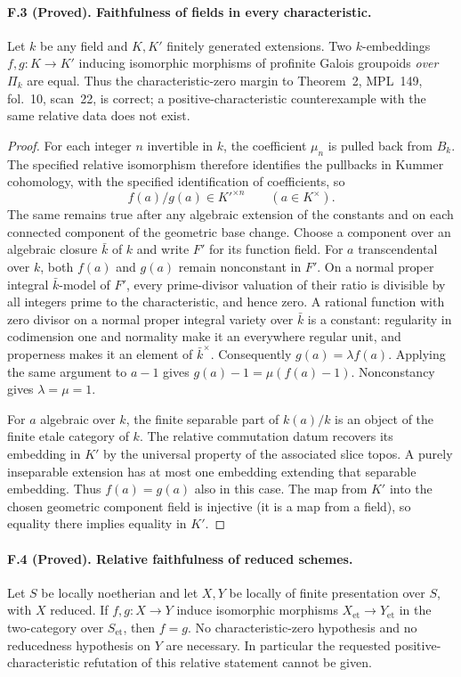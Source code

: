 \paragraph{F.3 (Proved). Faithfulness of fields in every characteristic.}
Let $k$ be any field and $K,K'$ finitely generated extensions. Two
$k$-embeddings $f,g:K\to K'$ inducing isomorphic morphisms of profinite
Galois groupoids \emph{over} $\Pi_k$ are equal. Thus the characteristic-zero
margin to Theorem~2, MPL~149, fol.~10, scan~22, is correct; a
positive-characteristic counterexample with the same relative data does
not exist.

\begin{proof}
For each integer $n$ invertible in $k$, the coefficient $\mu_n$ is pulled
back from $B_k$. The specified relative isomorphism therefore identifies
the pullbacks in Kummer cohomology, with the specified identification of
coefficients, so
\[
 f(a)/g(a)\in K'^{\times n}\qquad(a\in K^\times).
\]
The same remains true after any algebraic extension of the constants and
on each connected component of the geometric base change. Choose a
component over an algebraic closure $\bar k$ of $k$ and write $F'$ for its
function field. For $a$ transcendental over $k$, both $f(a)$ and $g(a)$
remain nonconstant in $F'$. On a normal proper integral $\bar k$-model of
$F'$, every prime-divisor valuation of their ratio is divisible by all
integers prime to the characteristic, and hence zero. A rational function
with zero divisor on a normal proper integral variety over $\bar k$ is a
constant: regularity in codimension one and normality make it an everywhere
regular unit, and properness makes it an element of $\bar k^\times$.
Consequently $g(a)=\lambda f(a)$. Applying the same argument to $a-1$
gives $g(a)-1=\mu(f(a)-1)$. Nonconstancy gives $\lambda=\mu=1$.

For $a$ algebraic over $k$, the finite separable part of $k(a)/k$ is an
object of the finite etale category of $k$. The relative commutation datum
recovers its embedding in $K'$ by the universal property of the associated
slice topos. A purely inseparable extension has at most one embedding
extending that separable embedding. Thus $f(a)=g(a)$ also in this case.
The map from $K'$ into the chosen geometric component field is injective
(it is a map from a field), so equality there implies equality in $K'$.
\end{proof}

\paragraph{F.4 (Proved). Relative faithfulness of reduced schemes.}
Let $S$ be locally noetherian and let $X,Y$ be locally of finite
presentation over $S$, with $X$ reduced. If $f,g:X\to Y$ induce isomorphic
morphisms $X_{\mathrm{et}}\to Y_{\mathrm{et}}$ in the two-category over
$S_{\mathrm{et}}$, then $f=g$. No characteristic-zero hypothesis and no
reducedness hypothesis on $Y$ are necessary. In particular the requested
positive-characteristic refutation of this relative statement cannot be
given.


